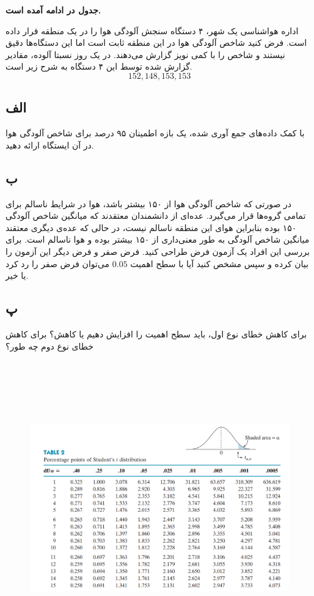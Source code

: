 \textbf{جدول
در ادامه آمده است.}

اداره هواشناسی یک شهر، ۴ دستگاه سنجش آلودگی هوا را در یک منطقه قرار داده است. فرض کنید شاخص آلودگی هوا در این منطقه ثابت است اما این دستگاه‌ها دقیق نیستند و شاخص را با کمی نویز گزارش می‌دهند. در یک روز نسبتا آلوده، مقادیر گزارش شده توسط این ۴ دستگاه به شرح زیر است.
$$152, 148, 153, 153$$

\subsection*{الف}
با کمک داده‌های جمع آوری شده، یک بازه اطمینان ۹۵ درصد برای شاخص آلودگی هوا در آن ایستگاه ارائه دهید.

\subsection*{ب}
در صورتی که شاخص آلودگی هوا از ۱۵۰ بیشتر باشد، هوا در شرایط ناسالم برای تمامی گروه‌ها قرار می‌گیرد. عده‌ای از دانشمندان معتقدند که میانگین شاخص آلودگی ۱۵۰ بوده بنابراین هوای این منطقه ناسالم نیست، در حالی که عده‌ی دیگری معتقند میانگین شاخص آلودگی به طور معنی‌داری از ۱۵۰ بیشتر بوده و هوا ناسالم است. برای بررسی این افراد یک آزمون فرض طراحی کنید. فرض صفر و فرض دیگر این آزمون را بیان کرده و سپس مشخص کنید آیا با سطح اهمیت 
$0.05$
می‌توان فرض صفر را رد کرد یا خیر.

\subsection*{پ}
برای کاهش خطای نوع اول، باید سطح اهمیت را افزایش دهیم یا کاهش؟ برای کاهش خطای نوع دوم چه طور؟

\begin{figure}[H]
    \centering
    \includegraphics[width=7in,height = 5in]{tStudent}
\end{figure}